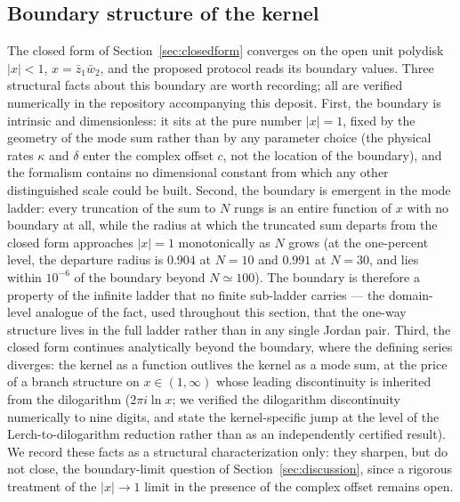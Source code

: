\documentclass[11pt,a4paper]{article}
\newcommand{\zbone}{\bar{z}_1}
\newcommand{\wbtwo}{\bar{w}_2}
\begin{document}
\subsection{Boundary structure of the kernel}
\label{sec:boundary}

The closed form of Section~\ref{sec:closedform} converges on the open unit
polydisk $|x| < 1$, $x = \zbone\wbtwo$, and the proposed protocol reads its
boundary values. Three structural facts about this boundary are worth
recording; all are verified numerically in the repository accompanying this
deposit. First, the boundary is intrinsic and dimensionless: it sits at the
pure number $|x| = 1$, fixed by the geometry of the mode sum rather than by
any parameter choice (the physical rates $\kappa$ and $\delta$ enter the
complex offset $c$, not the location of the boundary), and the formalism
contains no dimensional constant from which any other distinguished scale
could be built. Second, the boundary is emergent in the mode ladder: every
truncation of the sum to $N$ rungs is an entire function of $x$ with no
boundary at all, while the radius at which the truncated sum departs from
the closed form approaches $|x| = 1$ monotonically as $N$ grows (at the
one-percent level, the departure radius is $0.904$ at $N = 10$ and $0.991$
at $N = 30$, and lies within $10^{-6}$ of the boundary beyond
$N \simeq 100$). The boundary is therefore a property of the infinite
ladder that no finite sub-ladder carries --- the domain-level analogue of
the fact, used throughout this section, that the one-way structure lives in
the full ladder rather than in any single Jordan pair. Third, the closed
form continues analytically beyond the boundary, where the defining series
diverges: the kernel as a function outlives the kernel as a mode sum, at
the price of a branch structure on $x \in (1, \infty)$ whose leading
discontinuity is inherited from the dilogarithm ($2\pi i \ln x$; we
verified the dilogarithm discontinuity numerically to nine digits, and
state the kernel-specific jump at the level of the Lerch-to-dilogarithm
reduction rather than as an independently certified result). We record
these facts as a structural characterization only: they sharpen, but do
not close, the boundary-limit question of Section~\ref{sec:discussion},
since a rigorous treatment of the $|x| \to 1$ limit in the presence of the
complex offset remains open.
\end{document}
